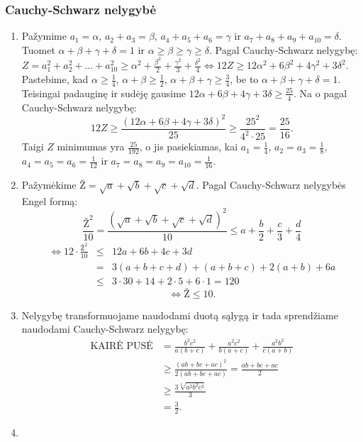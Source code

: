 \subsubsection*{Cauchy-Schwarz nelygybė}
\begin{enumerate}
\item
    Pažymime $a_1=\alpha$, $a_2+a_3=\beta$, $a_4+a_5+a_6=\gamma$ ir
    $a_7+a_8+a_9+a_{10}=\delta$. Tuomet $\alpha+\beta+\gamma+\delta=1$ ir
    $\alpha\geq\beta\geq\gamma\geq\delta$. Pagal Cauchy-Schwarz nelygybę:
    \\$Z=a_1^2+a_2^2+...+a_{10}^2\geq\alpha^2+\frac{\beta^2}{2}+\frac{\gamma^2}{3}+\frac{\delta^2}{4}\Leftrightarrow12Z\geq12\alpha^2+6\beta^2+4\gamma^2+3\delta^2.$
    Pastebime, kad $\alpha\geq\frac{1}{4}$, $\alpha+\beta\geq\frac{1}{2}$,
    $\alpha+\beta+\gamma\geq\frac{3}{4}$, be to
    $\alpha+\beta+\gamma+\delta=1$. Teisingai padauginę ir sudėję gausime
    $12\alpha+6\beta+4\gamma+3\delta\geq\frac{25}{4}.$ Na o pagal
    Cauchy-Schwarz nelygybę:
    $$12Z\geq\frac{(12\alpha+6\beta+4\gamma+3\delta)^2}{25}\geq\frac{25^2}{4^2\cdot25}=\frac{25}{16}.$$
    Taigi $Z$ minimumas yra $\frac{25}{192}$, o jis pasiekiamas, kai
    $a_1=\frac{1}{4}$, $a_2=a_3=\frac{1}{8}$, $a_4=a_5=a_6=\frac{1}{12}$
    ir $a_7=a_8=a_9=a_{10}=\frac{1}{16}$.
\item
    Pažymėkime $\mbox{Ž} = \sqrt{a} + \sqrt{b} + \sqrt{c} + \sqrt{d}.$
    Pagal Cauchy-Schwarz nelygybės Engel formą:
    $$\frac{\mbox{Ž}^2}{10}=\frac{(\sqrt{a}+\sqrt{b}+\sqrt{c}+\sqrt{d})^2}{10}\leq
    a+\frac{b}{2}+\frac{c}{3}+\frac{d}{4}$$
    \begin{eqnarray*}\Leftrightarrow12\cdot\frac{\mbox{Ž}^2}{10}&\leq&12a+6b+4c+3d\\
    &=&3(a+b+c+d)+(a+b+c)+2(a+b)+6a\\
    &\leq&3\cdot30+14+2\cdot5+6\cdot1=120
    \end{eqnarray*}$$\Leftrightarrow\mbox{Ž}\leq10.$$
\item
    Nelygybę transformuojame naudodami duotą sąlygą ir tada sprendžiame
    naudodami Cauchy-Schwarz nelygybę: \begin{align*} \mbox{KAIRĖ
    PUSĖ}&=\frac{b^2c^2}{a(b+c)}+\frac{a^2c^2}{b(a+c)}+\frac{a^2b^2}{c(a+b)}\\
    &\geq\frac{(ab+bc+ac)^2}{2(ab+bc+ac)}=\frac{ab+bc+ac}{2}\\
    &\geq\frac{3\sqrt[3]{a^2b^2c^2}}{3} \tag{AM-GM}\\
    &=\frac{3}{2}.\end{align*}
\item

\end{enumerate}
